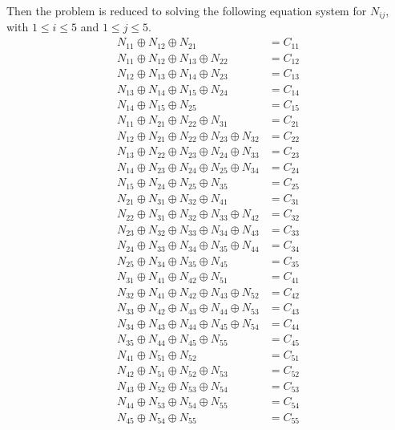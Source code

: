 \documentclass[12pt,letterpaper]{article}
\begin{document}
Then the problem is reduced to solving the following equation system for $N_{ij}$, with $1\le i \le 5$ and $1\le j \le 5$.
\begin{align}
N_{11} \oplus N_{12} \oplus N_{21} & = C_{11}\\
N_{11} \oplus N_{12} \oplus N_{13} \oplus N_{22} & = C_{12}\\
N_{12} \oplus N_{13} \oplus N_{14} \oplus N_{23} & = C_{13}\\
N_{13} \oplus N_{14} \oplus N_{15} \oplus N_{24} & = C_{14}\\
N_{14} \oplus N_{15} \oplus N_{25} & = C_{15}\\
N_{11} \oplus N_{21} \oplus N_{22} \oplus N_{31} & = C_{21}\\ 
N_{12} \oplus N_{21} \oplus N_{22} \oplus N_{23} \oplus N_{32} & = C_{22}\\
N_{13} \oplus N_{22} \oplus N_{23} \oplus N_{24} \oplus N_{33} & = C_{23}\\ 
N_{14} \oplus N_{23} \oplus N_{24} \oplus N_{25} \oplus N_{34} & = C_{24}\\ 
N_{15} \oplus N_{24} \oplus N_{25} \oplus N_{35} & = C_{25}\\ 
N_{21} \oplus N_{31} \oplus N_{32} \oplus N_{41} & = C_{31}\\ 
N_{22} \oplus N_{31} \oplus N_{32} \oplus N_{33} \oplus N_{42} & = C_{32}\\ 
N_{23} \oplus N_{32} \oplus N_{33} \oplus N_{34} \oplus N_{43} & = C_{33}\\ 
N_{24} \oplus N_{33} \oplus N_{34} \oplus N_{35} \oplus N_{44} & = C_{34}\\ 
N_{25} \oplus N_{34} \oplus N_{35} \oplus N_{45} & = C_{35}\\ 
N_{31} \oplus N_{41} \oplus N_{42} \oplus N_{51} & = C_{41}\\ 
N_{32} \oplus N_{41} \oplus N_{42} \oplus N_{43} \oplus N_{52} & = C_{42}\\ 
N_{33} \oplus N_{42} \oplus N_{43} \oplus N_{44} \oplus N_{53} & = C_{43}\\ 
N_{34} \oplus N_{43} \oplus N_{44} \oplus N_{45} \oplus N_{54} & = C_{44}\\ 
N_{35} \oplus N_{44} \oplus N_{45} \oplus N_{55} & = C_{45}\\ 
N_{41} \oplus N_{51} \oplus N_{52} & = C_{51}\\ 
N_{42} \oplus N_{51} \oplus N_{52} \oplus N_{53} & = C_{52}\\ 
N_{43} \oplus N_{52} \oplus N_{53} \oplus N_{54} & = C_{53}\\ 
N_{44} \oplus N_{53} \oplus N_{54} \oplus N_{55} & = C_{54}\\ 
N_{45} \oplus N_{54} \oplus N_{55} & = C_{55}
\end{align}
\end{document}
